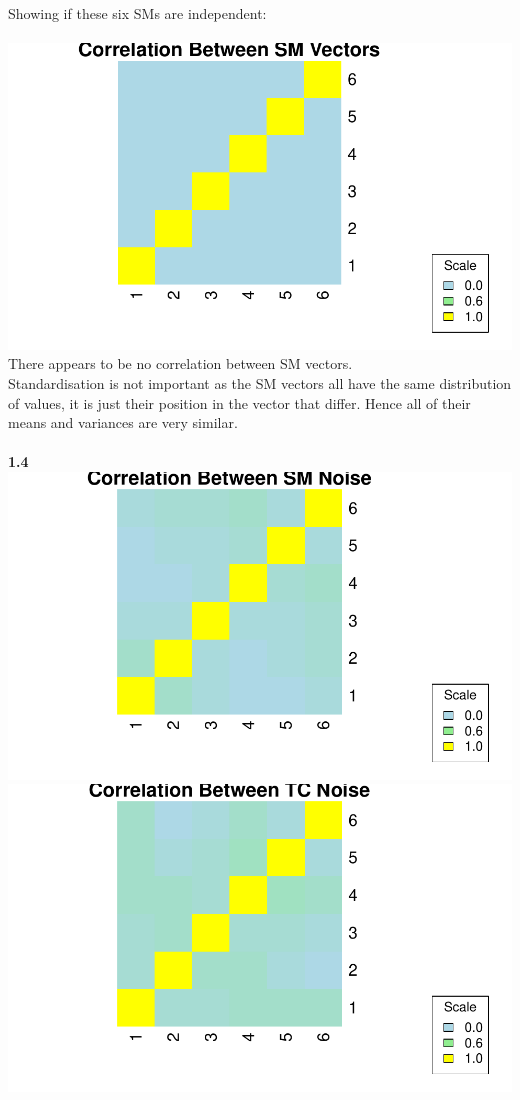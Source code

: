 \documentclass[11pt]{article}
\begin{document}
Showing if these six SMs are independent: \\\\
\includegraphics[width=.55\linewidth]{plots/SM_correlations.pdf}
\\
There appears to be no correlation between SM vectors.\\
Standardisation is not important as the SM vectors all have the same distribution of values, it is just their position in the vector that differ. Hence all of their means and variances are very similar.\\\\
\textbf{1.4}\\
 \includegraphics[width=.55\linewidth]{plots/SM_noise_corr.pdf}
\includegraphics[width=.55\linewidth]{plots/corr_TC_noise.pdf}
\end{document}
